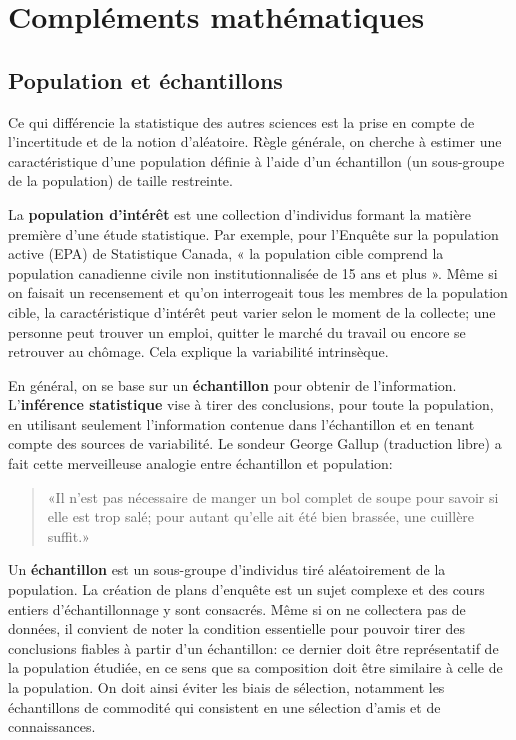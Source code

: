 \documentclass[
  11pt,
  letterpaper,
]{article}
\theoremstyle{definition}
\theoremstyle{definition}
\theoremstyle{definition}
\theoremstyle{remark}
\begin{document}
\hypertarget{appendix-annexe}{%
\appendix}


\hypertarget{complement}{%
\section{Compléments mathématiques}\label{complement}}

\hypertarget{population-echantillon}{%
\subsection{Population et échantillons}\label{population-echantillon}}

Ce qui différencie la statistique des autres sciences est la prise en compte de l'incertitude et de la notion d'aléatoire. Règle générale, on cherche à estimer une caractéristique d'une population définie à l'aide d'un échantillon (un sous-groupe de la population) de taille restreinte.

La \textbf{population d'intérêt} est une collection d'individus formant la matière première d'une étude statistique. Par exemple, pour l'Enquête sur la population active (EPA) de Statistique Canada, « la population cible comprend la population canadienne civile non institutionnalisée de 15 ans et plus ». Même si on faisait un recensement et qu'on interrogeait tous les membres de la population cible, la caractéristique d'intérêt peut varier selon le moment de la collecte; une personne peut trouver un emploi, quitter le marché du travail ou encore se retrouver au chômage. Cela explique la variabilité intrinsèque.

En général, on se base sur un \textbf{échantillon} pour obtenir de l'information. L'\textbf{inférence statistique} vise à tirer des conclusions, pour toute la population, en utilisant seulement l'information contenue dans l'échantillon et en tenant compte des sources de variabilité. Le sondeur George Gallup (traduction libre) a fait cette merveilleuse analogie entre échantillon et population:

\begin{quote}
«Il n'est pas nécessaire de manger un bol complet de soupe pour savoir si elle est trop salé; pour autant qu'elle ait été bien brassée, une cuillère suffit.»
\end{quote}

Un \textbf{échantillon} est un sous-groupe d'individus tiré aléatoirement de la population. La création de plans d'enquête est un sujet complexe et des cours entiers d'échantillonnage y sont consacrés. Même si on ne collectera pas de données, il convient de noter la condition essentielle pour pouvoir tirer des conclusions fiables à partir d'un échantillon: ce dernier doit être représentatif de la population étudiée, en ce sens que sa composition doit être similaire à celle de la population. On doit ainsi éviter les biais de sélection, notamment les échantillons de commodité qui consistent en une sélection d'amis et de connaissances.
\end{document}
